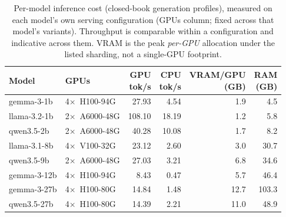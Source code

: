 \begin{table}[t]\centering\scriptsize
\caption{Per-model inference cost (closed-book generation profiles), measured on each model's own serving configuration (GPUs column; fixed across that model's variants). Throughput is comparable within a configuration and indicative across them. VRAM is the peak \emph{per-GPU} allocation under the listed sharding, not a single-GPU footprint.}
\label{tab:profiling}
\setlength{\tabcolsep}{3pt}\begin{tabular}{@{}llrrrr@{}}
\toprule
Model & GPUs & \shortstack[r]{GPU\\tok/s} & \shortstack[r]{CPU\\tok/s} & \shortstack[r]{VRAM/GPU\\(GB)} & \shortstack[r]{RAM\\(GB)} \\ \midrule
gemma-3-1b & 4$\times$~H100-94G & 27.93 & 4.54 & 1.9 & 4.5 \\
llama-3.2-1b & 2$\times$~A6000-48G & 108.10 & 18.19 & 1.2 & 5.8 \\
qwen3.5-2b & 2$\times$~A6000-48G & 40.28 & 10.08 & 1.7 & 8.2 \\
llama-3.1-8b & 4$\times$~V100-32G & 23.12 & 2.60 & 3.0 & 30.7 \\
qwen3.5-9b & 2$\times$~A6000-48G & 27.03 & 3.21 & 6.8 & 34.6 \\
gemma-3-12b & 4$\times$~H100-94G & 8.43 & 0.47 & 5.7 & 46.4 \\
gemma-3-27b & 4$\times$~H100-80G & 14.84 & 1.48 & 12.7 & 103.3 \\
qwen3.5-27b & 4$\times$~H100-80G & 14.39 & 2.21 & 11.0 & 48.9 \\
\bottomrule
\end{tabular}
\end{table}
